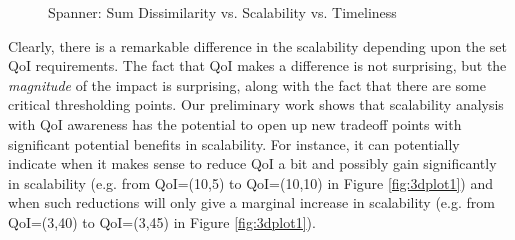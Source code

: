 \begin{figure}
   \caption{Spanner:  Sum Dissimilarity vs. Scalability vs. Timeliness}
\end{figure}

Clearly, there is a remarkable difference in the scalability depending upon the set QoI requirements.  The fact that QoI makes a difference is not surprising, but the {\em magnitude} of the impact is surprising, along with the fact that there are some critical thresholding points. Our preliminary work shows that scalability analysis with QoI awareness has the potential to open up new tradeoff points with significant potential benefits in scalability. For instance, it can potentially indicate when it makes sense to reduce QoI a bit and possibly gain significantly in scalability (e.g. from QoI=(10,5) to QoI=(10,10) in Figure \ref{fig:3dplot1}) and when such reductions will only give a marginal increase in scalability (e.g. from QoI=(3,40) to QoI=(3,45) in Figure \ref{fig:3dplot1}).

